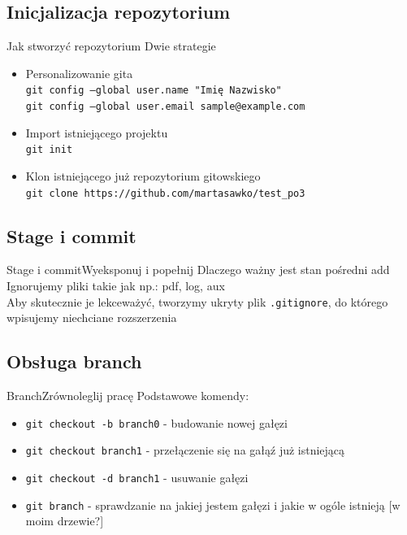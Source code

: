 \documentclass{beamer}
\begin{document}
\subsection{Inicjalizacja repozytorium}
\begin{frame}{Jak stworzyć repozytorium}
 Dwie strategie
 \begin{itemize}
  \item Personalizowanie gita \\
  \texttt{git config --global user.name "Imię Nazwisko" \\
 git config --global user.email sample@example.com}
  \item Import istniejącego projektu \\
  \texttt{git init}
  \item Klon istniejącego już repozytorium gitowskiego \\
  \texttt{git clone https://github.com/martasawko/test_}\texttt{po3}
 \end{itemize}
\end{frame}

\subsection{Stage i commit}
\begin{frame}{Stage i commit}{Wyeksponuj i popełnij}
 Dlaczego ważny jest stan pośredni add \\
 Ignorujemy pliki takie jak np.: pdf, log, aux \\
 Aby skutecznie je lekceważyć, tworzymy ukryty plik \texttt{.gitignore}, do którego wpisujemy niechciane rozszerzenia 
\end{frame}

\subsection{Obsługa branch}
\begin{frame}{Branch}{Zrównoleglij pracę}
 Podstawowe komendy:
 \begin{itemize}
  \item \texttt{git checkout -b branch0} - budowanie nowej gałęzi
  \item \texttt{git checkout  branch1} - przełączenie się na gałąź już istniejącą
  \item \texttt{git checkout -d branch1} - usuwanie gałęzi
  \item \texttt{git branch} - sprawdzanie na jakiej jestem gałęzi i jakie w ogóle istnieją [w moim drzewie?]
 \end{itemize}

\end{frame}
\end{document}
